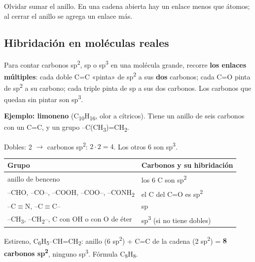 \begin{ojo} Olvidar sumar el anillo. En una cadena abierta hay un enlace menos que átomos; al cerrar el anillo se agrega un enlace más.\end{ojo}
\subsection{Hibridación en moléculas reales}
Para contar carbonos sp\textsuperscript{2}, sp o sp\textsuperscript{3} en una molécula grande, recorre \textbf{los enlaces múltiples}: cada doble C=C «pinta» de sp\textsuperscript{2} a sus \textbf{dos} carbonos; cada C=O pinta de sp\textsuperscript{2} a su carbono; cada triple pinta de sp a sus dos carbonos. Los carbonos que quedan sin pintar son sp\textsuperscript{3}.

 

\textbf{Ejemplo: limoneno} (C\textsubscript{10}H\textsubscript{16}, olor a cítricos). Tiene un anillo de seis carbonos con un C=C, y un grupo --C(CH\textsubscript{3})=CH\textsubscript{2}.

 

Dobles: 2 \ensuremath{\rightarrow} carbonos sp\textsuperscript{2}: $2\cdot 2 = 4$. Los otros 6 son sp\textsuperscript{3}.

 
\begin{center}\small
\begin{tabular}{@{}ll@{}}
\toprule
\textbf{Grupo} & \textbf{Carbonos y su hibridación} \\
\midrule
anillo de benceno & los 6 C son sp\textsuperscript{2} \\
--CHO, --CO--, --COOH, --COO--, --CONH\textsubscript{2} & el C del C=O es sp\textsuperscript{2} \\
--C\ensuremath{\equiv}N, --C\ensuremath{\equiv}C-- & sp \\
--CH\textsubscript{3}, --CH\textsubscript{2}--, C con OH o con O de éter & sp\textsuperscript{3} (si no tiene dobles) \\
\bottomrule
\end{tabular}
\end{center}
  
\begin{ejemplo} Estireno, C\textsubscript{6}H\textsubscript{5}--CH=CH\textsubscript{2}: anillo (6 sp\textsuperscript{2}) + C=C de la cadena (2 sp\textsuperscript{2}) = \textbf{8 carbonos sp\textsuperscript{2}}, ninguno sp\textsuperscript{3}. Fórmula C\textsubscript{8}H\textsubscript{8}.\end{ejemplo}
 
